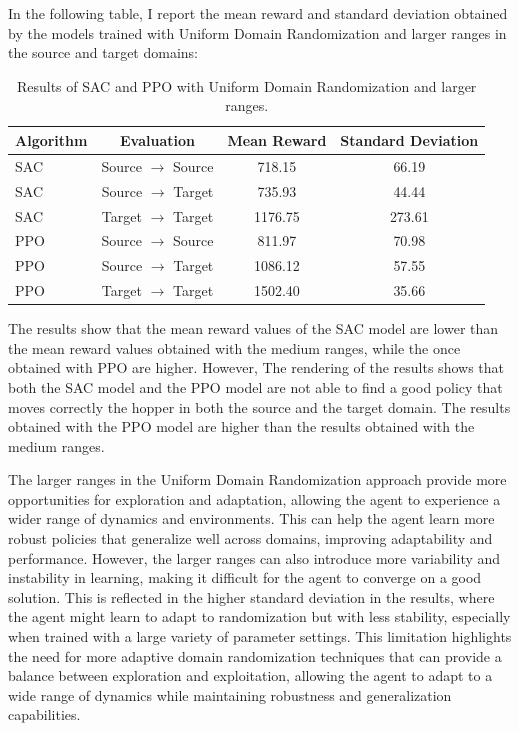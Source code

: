 \documentclass[11pt]{article}
\begin{document}
In the following table, I report the mean reward and standard deviation obtained by the models trained with Uniform Domain Randomization and larger ranges in the source and target domains:

\begin{table}[H]
    \centering
    \begin{tabular}{|l|c|c|c|}
        \hline
        \textbf{Algorithm} & \textbf{Evaluation} & \textbf{Mean Reward} & \textbf{Standard Deviation} \\ \hline
        SAC & Source $\rightarrow$ Source & 718.15 & 66.19 \\ 
        SAC & Source $\rightarrow$ Target & 735.93 & 44.44 \\ 
        SAC & Target $\rightarrow$ Target & 1176.75 & 273.61 \\ \hline
        PPO & Source $\rightarrow$ Source & 811.97 & 70.98 \\ 
        PPO & Source $\rightarrow$ Target & 1086.12 & 57.55 \\ 
        PPO & Target $\rightarrow$ Target & 1502.40 & 35.66 \\ \hline
    \end{tabular}
    \caption{Results of SAC and PPO with Uniform Domain Randomization and larger ranges.}
    \label{tab:results_udr_larger}
\end{table}

The results show that the mean reward values of the SAC model are lower than the mean reward values obtained with the medium ranges, while the once obtained with PPO are higher. However, The rendering of the results shows that both the SAC model and the PPO model are not able to find a good policy that moves correctly the hopper in both the source and the target domain. The results obtained with the PPO model are higher than the results obtained with the medium ranges. 

The larger ranges in the Uniform Domain Randomization approach provide more opportunities for exploration and adaptation, allowing the agent to experience a wider range of dynamics and environments. This can help the agent learn more robust policies that generalize well across domains, improving adaptability and performance. However, the larger ranges can also introduce more variability and instability in learning, making it difficult for the agent to converge on a good solution. This is reflected in the higher standard deviation in the results, where the agent might learn to adapt to randomization but with less stability, especially when trained with a large variety of parameter settings. This limitation highlights the need for more adaptive domain randomization techniques that can provide a balance between exploration and exploitation, allowing the agent to adapt to a wide range of dynamics while maintaining robustness and generalization capabilities.
\end{document}
